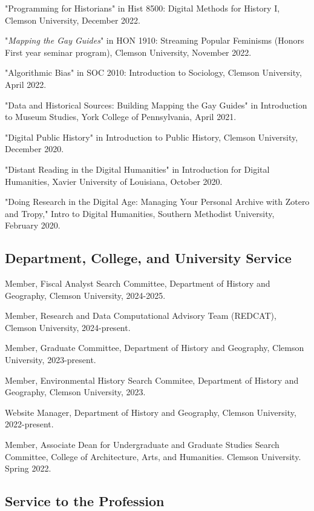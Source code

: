 \documentclass[11pt]{article}
\begin{document}
"Programming for Historians" in Hist 8500: Digital Methods for History I, Clemson University, December 2022.

"\emph{Mapping the Gay Guides}" in HON 1910: Streaming Popular Feminisms (Honors First year seminar program), Clemson University, November 2022. 

"Algorithmic Bias" in SOC 2010: Introduction to Sociology, Clemson University, April 2022.

"Data and Historical Sources: Building Mapping the Gay Guides" in Introduction to Museum Studies, York College of Pennsylvania, April 2021.

"Digital Public History" in Introduction to Public History, Clemson University, December 2020.

"Distant Reading in the Digital Humanities" in Introduction for Digital Humanities, Xavier University of Louisiana, October 2020.

"Doing Research in the Digital Age: Managing Your Personal Archive with Zotero and Tropy," Intro to Digital Humanities, Southern Methodist University, February 2020.

\subsection{Department, College, and University Service}\label{Department, College, and University Service}
Member, Fiscal Analyst Search Committee, Department of History and Geography, Clemson University, 2024-2025.

Member, Research and Data Computational Advisory Team (REDCAT), Clemson University, 2024-present.

Member, Graduate Committee, Department of History and Geography, Clemson University, 2023-present.

Member, Environmental History Search Commitee, Department of History and Geography, Clemson University, 2023.

Website Manager, Department of History and Geography, Clemson University, 2022-present.

Member, Associate Dean for Undergraduate and Graduate Studies Search Committee, College of Architecture, Arts, and Humanities. Clemson University. Spring 2022.

\subsection{Service to the Profession}\label{Other Professional and Community Service}
\end{document}
